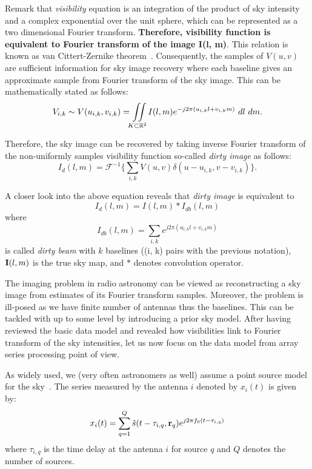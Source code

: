 \documentclass{article}
\begin{document}
Remark that {\it{visibility}} equation is an integration of the product of sky intensity and a complex exponential over the unit sphere, which can be represented as a two dimensional Fourier transform. {\bf{Therefore, {{visibility}} function is equivalent to Fourier transform of the image I(l, m\bf )}}. This relation is known as van Cittert-Zernike theorem~\cite{perley}.  Consequently, the samples of $V(u,v)$ are sufficient information for sky image recovery where each baseline gives an approximate sample from Fourier transform of the sky image. This can be mathematically stated as follows:
\begin{equation}\label{visibility equation}
V_{i,k} \sim V(u_{i,k}, v_{i,k}) = \iint\displaylimits_{K\subset \mathbb{R}^2} {I}(l, m)e^{-j2\pi (u_{i,k}l+v_{i,k}m)}\ dl\ dm.
\end{equation}

Therefore, the sky image can be recovered by taking inverse Fourier transform of the non-uniformly samples visibility function so-called {\it dirty image} as follows:
\begin{equation}
I_d(l, m) = \mathcal{F}^{-1}\Big \{ \sum_{i, k} V(u, v) \delta (u-u_{i,k}, v-v_{i,k}) \Big \}.\label{meas_eq_non_beam}
\end{equation}

A closer look into the above equation reveals that {\it dirty image} is equivalent to
\begin{equation}\label{eq:dirty_image}
I_d(l, m) = I(l, m)\ast I_{db}(l, m) \label{imaging_eq}
\end{equation}
where 
\begin{equation}\label{eq:dirty_beam}
I_{db}(l, m)= \sum_{i, k} e^{j2\pi(u_{i, k}l+v_{i, k}m)}\label{dirty_beam}
\end{equation}
is called {\it dirty beam} with $k$ baselines ((i, k) pairs with the previous notation), ${\bf I}(l, m)$ is the true sky map,  and $\ast$ denotes convolution operator.

The imaging problem in radio astronomy can be viewed as reconstructing a sky image from estimates of its Fourier transform samples. Moreover, the problem is ill-posed as we have finite number of antennas thus the baselines. This can be tackled with up to some level by introducing a prior sky model. After having reviewed the basic data model and revealed how visibilities link to Fourier transform of the sky intensities, let us now focus on the data model from array series processing point of view. 
 
As widely used, we (very often astronomers as well) assume a point source model for the sky~\cite{veen, perley}. The series measured by the antenna $i$ denoted by $x_i(t)$ is given by:
 \begin{equation}\label{idare}
 x_i(t) = \sum_{q=1}^Q \hat{s}(t-\tau_{i,q},{\bf r}_q)e^{j2\pi f_0 (t-\tau_{i,q})}
 \end{equation} 
 where $\tau_{i,q}$ is the time delay at the antenna $i$ for source $q$ and $Q$ denotes the number of sources. 
 
\end{document}
